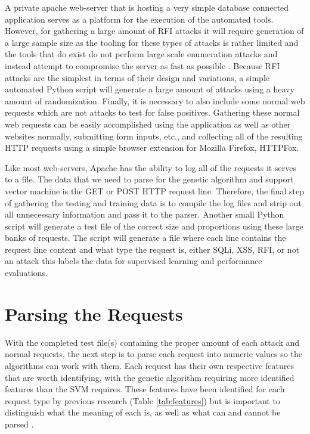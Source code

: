 A private apache web-server that is hosting a very simple database connected application serves as a platform for the execution of the automated tools.  However, for gathering a large amount of RFI attacks it will require generation of a large sample size as the tooling for these types of attacks is rather limited and the tools that do exist do not perform large scale enumeration attacks and instead attempt to compromise the server as fast as possible \cite{fimap}.  Because RFI attacks are the simplest in terms of their design and variations, a simple automated Python script will generate a large amount of attacks using a heavy amount of randomization.  Finally, it is necessary to also include some normal web requests which are not attacks to test for false positives.  Gathering these normal web requests can be easily accomplished using the application as well as other websites normally, submitting form inputs, etc., and collecting all of the resulting HTTP requests using a simple browser extension for Mozilla Firefox, HTTPFox.

Like most web-servers, Apache has the ability to log all of the requests it serves to a file.  The data that we need to parse for the genetic algorithm and support vector machine is the GET or POST HTTP request line. Therefore, the final step of gathering the testing and training data is to compile the log files and strip out all unnecessary information and pass it to the parser.  Another small Python script will generate a test file of the correct size and proportions using these large banks of requests.  The script will generate a file where each line contains the request line content and what type the request is, either SQLi, XSS, RFI, or not an attack this labels the data for supervised learning and performance evaluations.

\section{Parsing the Requests} \label{sec:methodsParser}

With the completed test file(s) containing the proper amount of each attack and normal requests, the next step is to parse each request into numeric values so the algorithms can work with them.  Each request has their own respective features that are worth identifying, with the genetic algorithm requiring more identified features than the SVM requires.  These features have been identified for each request type by previous research (Table \ref{tab:features}) but is important to distinguish what the meaning of each is, as well as what can and cannot be parsed \cite{mainPaper}.

